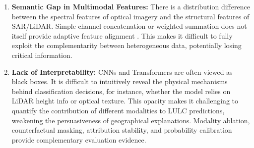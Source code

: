 \documentclass[]{interact}
\theoremstyle{plain}%
\theoremstyle{definition}
\theoremstyle{remark}
\DeclareRobustCommand{\DIFadd}[1]{{\protect\color{DIFaddcolor}\uwave{#1}}}
\DeclareRobustCommand{\DIFdel}[1]{{\protect\color{DIFdelcolor}\sout{#1}}}
\def\DIFadd#1{#1}%
\def\DIFdel#1{}%
\begin{document}
\begin{enumerate}
	\item \textbf{Semantic Gap in \DIFdel{Multi-modal} \DIFadd{Multimodal} Features:} There is a \DIFdel{significant} distribution difference between the spectral features \DIFdel{(}\DIFdel{chemical} \DIFdel{attributes}\DIFdel{)} of optical imagery and the structural features \DIFdel{(}\DIFdel{physical} \DIFdel{attributes}\DIFdel{)} of SAR/LiDAR. \DIFdel{Current} \DIFdel{mainstream} \DIFdel{fusion} \DIFdel{methods}\DIFdel{,} \DIFdel{such} \DIFdel{as} \DIFdel{simple} \DIFadd{Simple} channel concatenation or weighted summation\DIFdel{,} \DIFdel{lack} \DIFadd{does} \DIFadd{not} \DIFadd{itself} \DIFadd{provide} adaptive feature alignment \DIFdel{mechanisms}. This makes it difficult to fully exploit the complementarity between heterogeneous data, \DIFdel{resulting} \DIFdel{in} \DIFdel{the} \DIFdel{loss} \DIFdel{of} \DIFadd{potentially} \DIFadd{losing} critical information.
	
	\item \textbf{Lack of Interpretability:} \DIFdel{Despite} \DIFdel{their} \DIFdel{high} \DIFdel{accuracy}\DIFdel{,} \DIFdel{CNN} \DIFadd{CNNs} and \DIFdel{Transformer} \DIFadd{Transformers} are often viewed as black boxes. It is difficult to intuitively reveal the physical mechanisms behind classification decisions, for instance, whether the model relies on LiDAR height info or optical texture. This opacity makes it challenging to quantify the contribution of different \DIFdel{driving} \DIFdel{factors} \DIFadd{modalities} to LULC \DIFdel{changes} \DIFadd{predictions}, weakening the persuasiveness of geographical explanations. \DIFadd{Modality} \DIFadd{ablation}\DIFadd{,} \DIFadd{counterfactual} \DIFadd{masking}\DIFadd{,} \DIFadd{attribution} \DIFadd{stability}\DIFadd{,} \DIFadd{and} \DIFadd{probability} \DIFadd{calibration} \DIFadd{provide} \DIFadd{complementary} \DIFadd{evaluation} \DIFadd{evidence}\DIFadd{.}
	

\end{enumerate}
\end{document}
